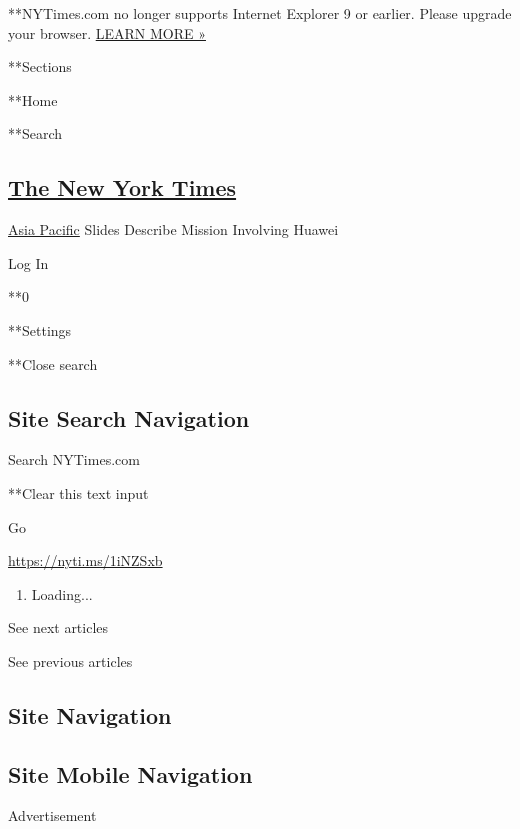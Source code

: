  **NYTimes.com no longer supports Internet Explorer 9 or earlier. Please
upgrade your browser.
\href{http://www.nytimes.com/content/help/site/ie9-support.html}{LEARN
MORE »}

**Sections

**Home

**Search

\hypertarget{the-new-york-times}{%
\subsection{\texorpdfstring{\href{http://www.nytimes.com/}{The New York
Times}}{The New York Times}}\label{the-new-york-times}}

 \href{/section/world/asia}{Asia Pacific} \textbar{}Slides Describe
Mission Involving Huawei

Log In

**0

**Settings

**Close search

\hypertarget{site-search-navigation}{%
\subsection{Site Search Navigation}\label{site-search-navigation}}

Search NYTimes.com

**Clear this text input

Go

\url{https://nyti.ms/1iNZSxb}

\begin{enumerate}
\def\labelenumi{\arabic{enumi}.}
\item
  Loading...
\end{enumerate}

See next articles

See previous articles

\hypertarget{site-navigation}{%
\subsection{Site Navigation}\label{site-navigation}}

\hypertarget{site-mobile-navigation}{%
\subsection{Site Mobile Navigation}\label{site-mobile-navigation}}

Advertisement

